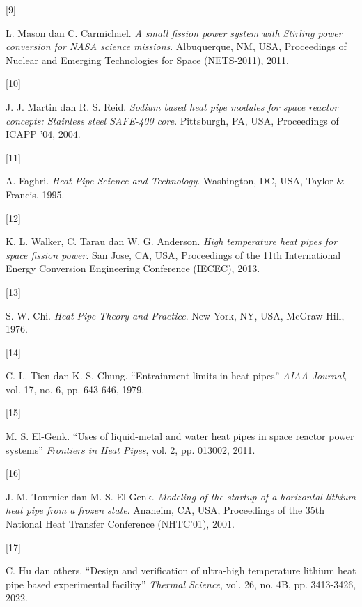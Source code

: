 \documentclass[
  indonesian,
  12pt,
  a4paper,
]{report}
\newlength{\cslhangindent}
\newlength{\csllabelwidth}
\newenvironment{CSLReferences}[2] %
 {\begin{list}{}{%
  \setlength{\itemindent}{0pt}
  \setlength{\leftmargin}{0pt}
  \setlength{\parsep}{0pt}
  \ifodd #1
   \setlength{\leftmargin}{\cslhangindent}
   \setlength{\itemindent}{-1\cslhangindent}
  \fi
  \setlength{\itemsep}{#2\baselineskip}}}
 {\end{list}}
\newcommand{\CSLLeftMargin}[1]{\parbox[t]{\csllabelwidth}{\strut#1\strut}}
\newcommand{\CSLRightInline}[1]{\parbox[t]{\linewidth - \csllabelwidth}{\strut#1\strut}}
\begin{document}
\begin{CSLReferences}{0}{1}
\CSLLeftMargin{{[}9{]} }%
\CSLRightInline{L. Mason dan C. Carmichael. \emph{A small fission power
system with {Stirling} power conversion for {NASA} science missions}.
Albuquerque, NM, USA, Proceedings of Nuclear and Emerging Technologies
for Space (NETS-2011), 2011.}

\CSLLeftMargin{{[}10{]} }%
\CSLRightInline{J. J. Martin dan R. S. Reid. \emph{Sodium based heat
pipe modules for space reactor concepts: Stainless steel {SAFE-400}
core}. Pittsburgh, PA, USA, Proceedings of ICAPP '04, 2004.}

\CSLLeftMargin{{[}11{]} }%
\CSLRightInline{A. Faghri. \emph{Heat Pipe Science and Technology}.
Washington, DC, USA, Taylor \& Francis, 1995.}

\CSLLeftMargin{{[}12{]} }%
\CSLRightInline{K. L. Walker, C. Tarau dan W. G. Anderson. \emph{High
temperature heat pipes for space fission power}. San Jose, CA, USA,
Proceedings of the 11th International Energy Conversion Engineering
Conference (IECEC), 2013.}

\CSLLeftMargin{{[}13{]} }%
\CSLRightInline{S. W. Chi. \emph{Heat Pipe Theory and Practice}. New
York, NY, USA, McGraw-Hill, 1976.}

\CSLLeftMargin{{[}14{]} }%
\CSLRightInline{C. L. Tien dan K. S. Chung. {``Entrainment limits in
heat pipes''} \emph{AIAA Journal}, vol. 17, no. 6, pp. 643-646, 1979.}

\CSLLeftMargin{{[}15{]} }%
\CSLRightInline{M. S. El-Genk.
{``\href{https://doi.org/10.5098/fhp.v2.1.3002}{Uses of liquid-metal and
water heat pipes in space reactor power systems}''} \emph{Frontiers in
Heat Pipes}, vol. 2, pp. 013002, 2011.}

\CSLLeftMargin{{[}16{]} }%
\CSLRightInline{J.-M. Tournier dan M. S. El-Genk. \emph{Modeling of the
startup of a horizontal lithium heat pipe from a frozen state}. Anaheim,
CA, USA, Proceedings of the 35th National Heat Transfer Conference
(NHTC'01), 2001.}

\CSLLeftMargin{{[}17{]} }%
\CSLRightInline{{C. Hu dan others}. {``Design and verification of
ultra-high temperature lithium heat pipe based experimental facility''}
\emph{Thermal Science}, vol. 26, no. 4B, pp. 3413-3426, 2022.}


\end{CSLReferences}
\end{document}
